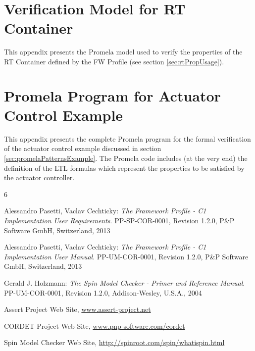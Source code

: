 \documentclass[definition]{../fwprofile}
\begin{document}
\appendix
\section{Verification Model for RT Container}\label{sec:verificationModelForRtContainers}
This appendix presents the Promela model used to verify the properties of the RT Container defined by the FW Profile (see section \ref{sec:rtPropUsage}).  

\begin{landscape}

\end{landscape}

\section{Promela Program for Actuator Control Example}\label{sec:promelaProgForActExample}
This appendix presents the complete Promela program for the formal verification of the actuator control example discussed in section \ref{sec:promelaPatternsExample}. The Promela code includes (at the very end) the definition of the LTL formulas which represent the properties to be satisfied by the actuator controller.   

\begin{landscape}

\end{landscape}



\begin{thebibliography}{6}

 Alessandro Pasetti, Vaclav Cechticky:
           {\sl The Framework Profile - C1 Implementation User Requirements}. PP-SP-COR-0001, Revision 1.2.0,
           P\&P Software GmbH, Switzerland, 2013

 Alessandro Pasetti, Vaclav Cechticky:
            {\sl The Framework Profile - C1 Implementation User Manual}. PP-UM-COR-0001, Revision 1.2.0,
            P\&P Software GmbH, Switzerland, 2013 

 Gerald J. Holzmann:
            {\sl The Spin Model Checker - Primer and Reference Manual}. PP-UM-COR-0001, Revision 1.2.0,
            Addison-Wesley, U.S.A., 2004 

 Assert Project Web Site, \url{www.assert-project.net}

 CORDET Project Web Site, \url{www.pnp-software.com/cordet}

 Spin Model Checker Web Site, \url{http://spinroot.com/spin/whatispin.html}

\end{thebibliography}
\end{document}
